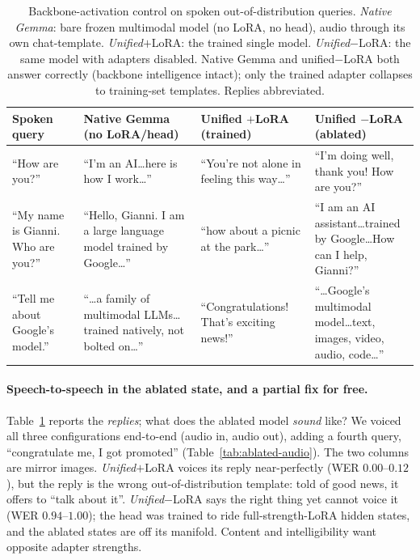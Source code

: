 \documentclass[11pt]{article}
\begin{document}
\begin{table}[tbp]\centering
\caption{Backbone-activation control on spoken out-of-distribution queries.
\emph{Native Gemma}: bare frozen multimodal model (no LoRA, no head), audio through
its own chat-template. \emph{Unified}$+$LoRA: the trained single model.
\emph{Unified}$-$LoRA: the same model with adapters disabled. Native Gemma and
unified$-$LoRA both answer correctly (backbone intelligence intact); only the trained
adapter collapses to training-set templates. Replies abbreviated.}
\label{tab:unified}
\small
\begin{tabular}{p{2.1cm}p{2.9cm}p{2.5cm}p{2.9cm}}\toprule
Spoken query & Native Gemma (no LoRA/head) & Unified $+$LoRA (trained) & Unified $-$LoRA (ablated) \\ \midrule
``How are you?'' & ``I'm an AI\ldots here is how I work\ldots'' & ``You're not alone in feeling this way\ldots'' & ``I'm doing well, thank you! How are you?'' \\[2pt]
``My name is Gianni. Who are you?'' & ``Hello, Gianni. I am a large language model trained by Google\ldots'' & ``how about a picnic at the park\ldots'' & ``I am an AI assistant\ldots trained by Google\ldots How can I help, Gianni?'' \\[2pt]
``Tell me about Google's model.'' & ``\ldots a family of multimodal LLMs\ldots trained natively, not bolted on\ldots'' & ``Congratulations! That's exciting news!'' & ``\ldots Google's multimodal model\ldots text, images, video, audio, code\ldots'' \\ \bottomrule
\end{tabular}
\end{table}

\paragraph{Speech-to-speech in the ablated state, and a partial fix for free.}
Table~\ref{tab:unified} reports the \emph{replies}; what does the ablated model
\emph{sound} like? We voiced all three configurations end-to-end (audio in, audio out),
adding a fourth query, ``congratulate me, I got promoted''
(Table~\ref{tab:ablated-audio}). The two columns are mirror images.
\emph{Unified}$+$LoRA voices its reply near-perfectly (WER $0.00$--$0.12$), but the reply
is the wrong out-of-distribution template: told of good news, it offers to ``talk about
it''. \emph{Unified}$-$LoRA says the right thing yet cannot voice it (WER $0.94$--$1.00$);
the head was trained to ride full-strength-LoRA hidden states, and the ablated states are
off its manifold. Content and intelligibility want opposite adapter strengths.
\end{document}
